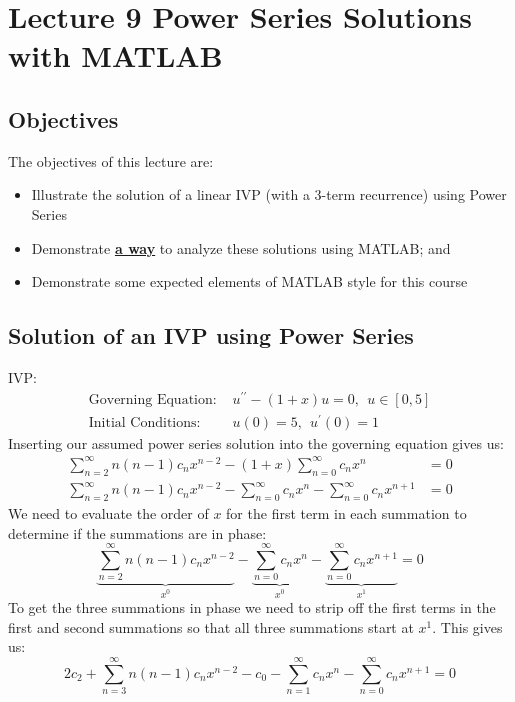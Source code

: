 \chapter{Lecture 9 Power Series Solutions with MATLAB}
\label{ch:lec9}
\section{Objectives}
The objectives of this lecture are:
\begin{itemize}
\item Illustrate the solution of a linear IVP (with a 3-term recurrence) using Power Series
\item Demonstrate \textbf\underline{a way} to analyze these solutions using MATLAB; and
\item Demonstrate some expected elements of MATLAB style for this course
\end{itemize}

\section{Solution of an IVP using Power Series}

 IVP:
\begin{align*}
\text{Governing Equation:   }& u^{\prime \prime}-(1+x)u = 0, \ \ u\in[0,5]\\
\text{Initial Conditions:   }& u(0) = 5, \ \ u^{\prime}(0) = 1
\end{align*}
Inserting our assumed power series solution into the governing equation gives us:
\begin{align*}
\sum\limits_{n=2}^{\infty}n(n-1)c_nx^{n-2} - (1+x)\sum\limits_{n=0}^{\infty}c_nx^n &= 0 \\
\sum\limits_{n=2}^{\infty}n(n-1)c_nx^{n-2} - \sum\limits_{n=0}^{\infty}c_nx^{n} - \sum\limits_{n=0}^{\infty}c_nx^{n+1} &= 0
\end{align*}
\noindent We need to evaluate the order of $x$ for the first term in each summation to determine if the summations are in phase:
\begin{equation*}
\underbrace{\sum\limits_{n=2}^{\infty}n(n-1)c_nx^{n-2}}_{x^0} - \underbrace{\sum\limits_{n=0}^{\infty}c_nx^{n}}_{x^0} - \underbrace{\sum\limits_{n=0}^{\infty}c_nx^{n+1}}_{x^1} = 0
\end{equation*}
To get the three summations in phase we need to strip off the first terms in the first and second summations so that all three summations start at $x^{1}$.  This gives us:
\begin{equation*}
2c_2 + \sum\limits_{n=3}^{\infty}n(n-1)c_nx^{n-2} - c_0 - \sum\limits_{n=1}^{\infty} c_nx^n -\sum\limits_{n=0}^{\infty}c_nx^{n+1} = 0
\end{equation*}

